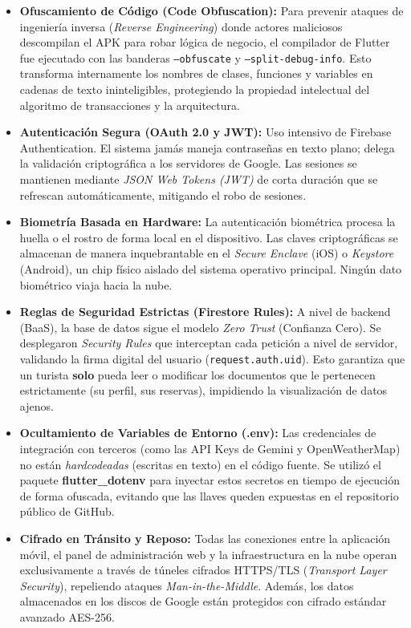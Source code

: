 \documentclass[12pt,letterpaper]{report}
\newcommand{\tech}[1]{\textbf{#1}}
\begin{document}
\begin{itemize}
  \item \textbf{Ofuscamiento de Código (Code Obfuscation):} Para prevenir ataques de ingeniería inversa (\textit{Reverse Engineering}) donde actores maliciosos descompilan el APK para robar lógica de negocio, el compilador de Flutter fue ejecutado con las banderas \texttt{--obfuscate} y \texttt{--split-debug-info}. Esto transforma internamente los nombres de clases, funciones y variables en cadenas de texto ininteligibles, protegiendo la propiedad intelectual del algoritmo de transacciones y la arquitectura.
  \item \textbf{Autenticación Segura (OAuth 2.0 y JWT):} Uso intensivo de Firebase Authentication. El sistema jamás maneja contraseñas en texto plano; delega la validación criptográfica a los servidores de Google. Las sesiones se mantienen mediante \textit{JSON Web Tokens (JWT)} de corta duración que se refrescan automáticamente, mitigando el robo de sesiones.
  \item \textbf{Biometría Basada en Hardware:} La autenticación biométrica procesa la huella o el rostro de forma local en el dispositivo. Las claves criptográficas se almacenan de manera inquebrantable en el \textit{Secure Enclave} (iOS) o \textit{Keystore} (Android), un chip físico aislado del sistema operativo principal. Ningún dato biométrico viaja hacia la nube.
  \item \textbf{Reglas de Seguridad Estrictas (Firestore Rules):} A nivel de backend (BaaS), la base de datos sigue el modelo \textit{Zero Trust} (Confianza Cero). Se desplegaron \textit{Security Rules} que interceptan cada petición a nivel de servidor, validando la firma digital del usuario (\texttt{request.auth.uid}). Esto garantiza que un turista \textbf{solo} pueda leer o modificar los documentos que le pertenecen estrictamente (su perfil, sus reservas), impidiendo la visualización de datos ajenos.
  \item \textbf{Ocultamiento de Variables de Entorno (.env):} Las credenciales de integración con terceros (como las API Keys de Gemini y OpenWeatherMap) no están \textit{hardcodeadas} (escritas en texto) en el código fuente. Se utilizó el paquete \tech{flutter\_dotenv} para inyectar estos secretos en tiempo de ejecución de forma ofuscada, evitando que las llaves queden expuestas en el repositorio público de GitHub.
  \item \textbf{Cifrado en Tránsito y Reposo:} Todas las conexiones entre la aplicación móvil, el panel de administración web y la infraestructura en la nube operan exclusivamente a través de túneles cifrados HTTPS/TLS (\textit{Transport Layer Security}), repeliendo ataques \textit{Man-in-the-Middle}. Además, los datos almacenados en los discos de Google están protegidos con cifrado estándar avanzado AES-256.
\end{itemize}
\end{document}
